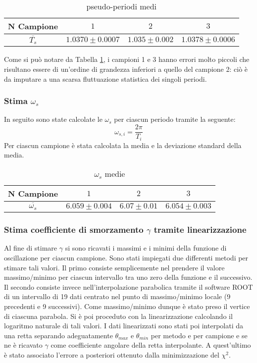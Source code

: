\documentclass[a4paper,11pt,oneside]{article}
\begin{document}
\begin{table}[h!]
    \centering
    \begin{tabular}{|c|c|c|c|}
        \hline
        \textbf{N Campione} & $1$ & $2$ & $3$\\ \hline
        \textbf{$\overline{T_s}$} & $1.0370\pm0.0007$ & $1.035\pm0.002$ & $1.0378\pm0.0006$\\ \hline
    \end{tabular}
    \caption{pseudo-periodi medi}
    \label{tab:pseudo-periodi_medi}
\end{table}

Come si può notare da Tabella \ref{tab:pseudo-periodi_medi}, i campioni 1 e 3 hanno errori molto piccoli che risultano essere di un'ordine di grandezza inferiori a quello del campione 2: ciò è da imputare a una scarsa fluttuazione statistica dei singoli periodi.

\subsubsection{Stima $\omega_s$ }
In seguito sono state calcolate le $\omega_s$ per ciascun periodo tramite la seguente:
\begin{equation*}
    \omega_{s,i} = \frac{2\pi}{T_i}
\end{equation*}
Per ciascun campione è stata calcolata la media e la deviazione standard della media.

\begin{table}[h!]
    \centering
    \begin{tabular}{|c|c|c|c|}
        \hline
        \textbf{N Campione} & $1$ & $2$ & $3$\\ \hline
        \textbf{$\overline{\omega_s}$} & $6.059\pm0.004$ & $6.07\pm0.01$ & $6.054\pm0.003$\\ \hline
    \end{tabular}
    \caption{$\omega_s$ medie}
    \label{tab:omega_s_medie}
\end{table}


\subsubsection{Stima coefficiente di smorzamento $\gamma$ tramite linearizzazione}
Al fine di stimare $\gamma$ si sono ricavati i massimi e i minimi della funzione di oscillazione per ciascun campione. Sono stati impiegati due differenti metodi per stimare tali valori. Il primo consiste semplicemente nel prendere il valore massimo/minimo per ciascun intervallo tra uno zero della funzione e il successivo. Il secondo consiste invece nell'interpolazione parabolica tramite il software ROOT di un intervallo di 19 dati centrato nel punto di massimo/minimo locale (9 precedenti e 9 successivi). Come massimo/minimo dunque è stato preso il vertice di ciascuna parabola. Si è poi proceduto con la linearizzazione calcolando il logaritmo naturale di tali valori. I dati linearizzati sono stati poi interpolati da una retta separando adeguatamente $\theta_{max}$ e $\theta_{min}$ per metodo e per campione e se ne è ricavato $\gamma$ come coefficiente angolare della retta interpolante. A quest'ultimo è stato associato l'errore a posteriori ottenuto dalla minimizzazione del $\chi^2$.
\end{document}
